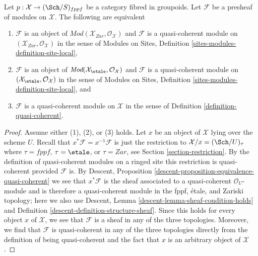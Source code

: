 \begin{lemma}
\label{lemma-characterize-quasi-coherent-bis}
Let $p : \mathcal{X} \to (\Sch/S)_{fppf}$ be a category
fibred in groupoids. Let $\mathcal{F}$ be a presheaf of
modules on $\mathcal{X}$. The following are equivalent
\begin{enumerate}
\item $\mathcal{F}$ is an object of
$\textit{Mod}(\mathcal{X}_{Zar}, \mathcal{O}_\mathcal{X})$
and $\mathcal{F}$ is a quasi-coherent module on
$(\mathcal{X}_{Zar}, \mathcal{O}_\mathcal{X})$ in the sense of
Modules on Sites, Definition \ref{sites-modules-definition-site-local},
\item $\mathcal{F}$ is an object of
$\textit{Mod}(\mathcal{X}_\etale, \mathcal{O}_\mathcal{X})$
and $\mathcal{F}$ is a quasi-coherent module on
$(\mathcal{X}_\etale, \mathcal{O}_\mathcal{X})$ in the sense of
Modules on Sites, Definition \ref{sites-modules-definition-site-local}, and
\item $\mathcal{F}$ is a quasi-coherent module on $\mathcal{X}$
in the sense of Definition \ref{definition-quasi-coherent}.
\end{enumerate}
\end{lemma}

\begin{proof}
Assume either (1), (2), or (3) holds.
Let $x$ be an object of $\mathcal{X}$ lying over the scheme $U$.
Recall that $x^*\mathcal{F} = x^{-1}\mathcal{F}$ is just the
restriction to $\mathcal{X}/x = (\Sch/U)_\tau$ where
$\tau = fppf$, $\tau = \etale$, or $\tau = Zar$, see
Section \ref{section-restriction}.
By the definition of quasi-coherent modules on a ringed site
this restriction is quasi-coherent provided $\mathcal{F}$ is.
By Descent, Proposition \ref{descent-proposition-equivalence-quasi-coherent}
we see that $x^*\mathcal{F}$ is the sheaf associated to
a quasi-coherent $\mathcal{O}_U$-module and is therefore
a quasi-coherent module in the fppf, \'etale, and Zariski
topology; here we also use
Descent, Lemma \ref{descent-lemma-sheaf-condition-holds} and
Definition \ref{descent-definition-structure-sheaf}.
Since this holds for every object $x$ of $\mathcal{X}$,
we see that $\mathcal{F}$ is a sheaf in any of the three topologies.
Moreover, we find that $\mathcal{F}$ is quasi-coherent in any
of the three topologies directly from the definition of being
quasi-coherent and the fact that $x$ is an arbitrary object of $\mathcal{X}$.
\end{proof}







